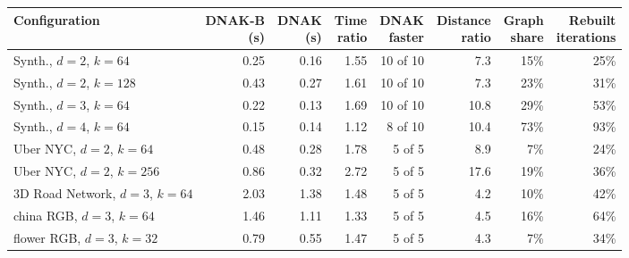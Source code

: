 \begin{tabular}{lrrrrrrr}
\toprule
Configuration & \shortstack[r]{DNAK-B\\ (s)} & \shortstack[r]{DNAK\\ (s)} & \shortstack[r]{Time\\ ratio} & \shortstack[r]{DNAK\\ faster} & \shortstack[r]{Distance\\ ratio} & \shortstack[r]{Graph\\ share} & \shortstack[r]{Rebuilt\\ iterations} \\
\midrule
Synth., $d{=}2$, $k{=}64$ & 0.25 & 0.16 & 1.55 & 10 of 10 & 7.3 & 15\% & 25\% \\
Synth., $d{=}2$, $k{=}128$ & 0.43 & 0.27 & 1.61 & 10 of 10 & 7.3 & 23\% & 31\% \\
Synth., $d{=}3$, $k{=}64$ & 0.22 & 0.13 & 1.69 & 10 of 10 & 10.8 & 29\% & 53\% \\
Synth., $d{=}4$, $k{=}64$ & 0.15 & 0.14 & 1.12 & 8 of 10 & 10.4 & 73\% & 93\% \\
Uber NYC, $d{=}2$, $k{=}64$ & 0.48 & 0.28 & 1.78 & 5 of 5 & 8.9 & 7\% & 24\% \\
Uber NYC, $d{=}2$, $k{=}256$ & 0.86 & 0.32 & 2.72 & 5 of 5 & 17.6 & 19\% & 36\% \\
3D Road Network, $d{=}3$, $k{=}64$ & 2.03 & 1.38 & 1.48 & 5 of 5 & 4.2 & 10\% & 42\% \\
china RGB, $d{=}3$, $k{=}64$ & 1.46 & 1.11 & 1.33 & 5 of 5 & 4.5 & 16\% & 64\% \\
flower RGB, $d{=}3$, $k{=}32$ & 0.79 & 0.55 & 1.47 & 5 of 5 & 4.3 & 7\% & 34\% \\
\bottomrule
\end{tabular}

